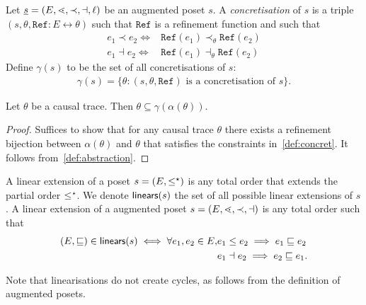 \begin{definition}
  \label{def:concret}
  Let $\underline s=(E,\lessdot,\prec,\dashv,\ell)$ be an augmented poset $s$.
  A \emph{concretisation} of $s$ is a triple $(s,\theta,\mathtt{Ref}:E\leftrightarrow\theta)$ such that $\mathtt{Ref}$ is a refinement function and such that
  \begin{align*}
    e_1\prec e_2 \iff& \mathtt{Ref}(e_1) \prec_{\theta}\mathtt{Ref}(e_2)\\
    e_1\dashv e_2 \iff& \mathtt{Ref}(e_1) \dashv_{\theta}\mathtt{Ref}(e_2)
  \end{align*}
  Define $\gamma(s)$ to be the set of all concretisations of $s$:
  \begin{align*}
    \gamma(s) = \{\theta: (s,\theta,\mathtt{Ref})\text{ is a concretisation of }s\}.
  \end{align*}
\end{definition}

\begin{theorem}
  Let $\theta$ be a causal trace. Then $\theta\subseteq\gamma(\alpha(\theta))$.
\end{theorem}
\begin{proof}
  Suffices to show that for any causal trace $\theta$ there exists a refinement bijection between $\alpha(\theta)$ and $\theta$ that satisfies the constraints in~\autoref{def:concret}. It follows from~\autoref{def:abstraction}.
\end{proof}


\begin{definition}
  \label{def:linears}
  A linear extension of a poset $s=(E,\leq^{\star})$ is any total order that extends the partial order $\leq^{\star}$. We denote $\mathsf{linears}(s)$ the set of all possible linear extensions of $s$. A linear extension of a augmented poset $s=(E,\lessdot,\prec,\dashv)$ is any total order such that
  \begin{align*}
    (E,\sqsubseteq)\in\mathsf{linears}(s) \iff \forall e_1,e_2\in E, &e_1\leq e_2\implies e_1\sqsubseteq e_2\\
    & e_1\dashv e_2\implies e_2\sqsubseteq e_1.
  \end{align*}
\end{definition}
Note that linearisations do not create cycles, as follows from the definition of augmented posets.

